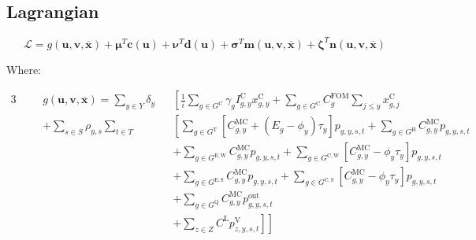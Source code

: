 \documentclass{article}
\newcommand{\sGeneratorsExisting}{G^{\mathrm{E}}}
\newcommand{\sGeneratorsExistingWind}{G^{\mathrm{E,W}}}
\newcommand{\sGeneratorsExistingSolar}{G^{\mathrm{E,S}}}
\newcommand{\sGeneratorsCandidate}{G^{\mathrm{C}}}
\newcommand{\sGeneratorsCandidateWind}{G^{\mathrm{C,W}}}
\newcommand{\sGeneratorsCandidateSolar}{G^{\mathrm{C,S}}}
\newcommand{\sGeneratorsThermal}{G^{\mathrm{T}}}
\newcommand{\sGeneratorsHydro}{G^{\mathrm{H}}}
\newcommand{\sStorage}{G^{\mathrm{Q}}}
\newcommand{\sYears}{Y}
\newcommand{\sScenarios}{S}
\newcommand{\sIntervals}{T}
\newcommand{\sZones}{Z}
\newcommand{\iGenerator}{g}
\newcommand{\iYear}{y}
\newcommand{\iYearTerminal}{\overline{\iYear}}
\newcommand{\iYearAlias}{j}
\newcommand{\iScenario}{s}
\newcommand{\iInterval}{t}
\newcommand{\iZone}{z}
\newcommand{\cFixedOperationsMaintenanceCostGenerator}[1][\iGenerator]{C^{\mathrm{FOM}}_{#1}}
\newcommand{\cScenarioDuration}[1][\iYear,\iScenario]{\rho_{#1}}
\newcommand{\cMarginalCost}[1][\iGenerator,\iYear]{C^{\mathrm{MC}}_{#1}}
\newcommand{\cEmissionsIntensity}[1][\iGenerator]{E_{#1}}
\newcommand{\cPowerOutputMax}[1][\iGenerator,\iYear]{\overline{P}_{#1}}
\newcommand{\cAmortisationRate}[1][\iGenerator]{\gamma_{#1}}
\newcommand{\cCandidateInvestmentCost}[1][\iGenerator,\iYear]{I^{\mathrm{C}}_{#1}}
\newcommand{\cInterestRate}{i}
\newcommand{\cLostLoadCost}{C^{\mathrm{L}}}
\newcommand{\cRetirementIndicator}[1][\iGenerator,\iYear]{F_{#1}}
\newcommand{\cDiscountRate}[1][\iYear]{\delta_{#1}}
\newcommand{\vBaseline}[1][\iYear]{\phi_{#1}}
\newcommand{\vPermitPrice}[1][\iYear]{\tau_{#1}}
\newcommand{\vInstalledCapacity}[1][\iGenerator,\iYear]{x^{\mathrm{C}}_{#1}}
\newcommand{\vPower}[1][\iGenerator,\iYear,\iScenario,\iInterval]{p_{#1}}
\newcommand{\vPowerOut}[1][\iGenerator,\iYear,\iScenario,\iInterval]{p^{\mathrm{out}}_{#1}}
\newcommand{\vLostLoadPower}[1][\iZone,\iYear,\iScenario,\iInterval]{p^{\mathrm{V}}_{#1}}
\begin{document}
\subsection{Lagrangian}

\begin{equation}
	\mathcal{L} = g(\bm{u}, \bm{v}, \overline{\bm{x}}) + \bm{\mu}^{T}\bm{c}(\bm{u}) + \bm{\nu}^{T}\bm{d}(\bm{u}) + \bm{\sigma}^{T}\bm{m}(\bm{u}, \bm{v}, \bm{\overline{x}}) + \bm{\zeta}^{T} \bm{n}(\bm{u}, \bm{v}, \bm{\overline{x}})
\end{equation}

Where:

\begin{alignat}{3}
	& && g(\bm{u}, \bm{v}, \overline{\bm{x}}) = \sum\limits_{\iYear \in \sYears} \cDiscountRate  &&  \left[\frac{1}{\cInterestRate} \sum\limits_{g\in \sGeneratorsCandidate} \cAmortisationRate  \cCandidateInvestmentCost \vInstalledCapacity + \sum\limits_{\iGenerator \in \sGeneratorsCandidate} \cFixedOperationsMaintenanceCostGenerator \sum\limits_{\iYearAlias \leq \iYear} \vInstalledCapacity[\iGenerator,\iYearAlias] 
	\right. \nonumber\\ 
	& && + \sum\limits_{\iScenario \in \sScenarios} \cScenarioDuration \sum\limits_{\iInterval \in \sIntervals} && \left[\sum\limits_{\iGenerator \in \sGeneratorsThermal} \left[\cMarginalCost + (\cEmissionsIntensity - \vBaseline)\vPermitPrice\right]\vPower  + \sum\limits_{\iGenerator \in \sGeneratorsHydro}\cMarginalCost \vPower \right. \nonumber\\
	& && && + \sum\limits_{\iGenerator \in \sGeneratorsExistingWind} \cMarginalCost \vPower + \sum\limits_{\iGenerator \in \sGeneratorsCandidateWind} \left[\cMarginalCost - \vBaseline \vPermitPrice\right] \vPower \nonumber\\
	& && && + \sum\limits_{\iGenerator \in \sGeneratorsExistingSolar} \cMarginalCost \vPower + \sum\limits_{\iGenerator \in \sGeneratorsCandidateSolar} \left[\cMarginalCost - \vBaseline\vPermitPrice\right] \vPower\nonumber\\
	& && && + \sum\limits_{\iGenerator \in \sStorage} \cMarginalCost \vPowerOut \nonumber\\
	& && && \left.\left. + \sum\limits_{\iZone \in \sZones} \cLostLoadCost \vLostLoadPower \right]\right] \nonumber\\

\end{alignat}
\end{document}
